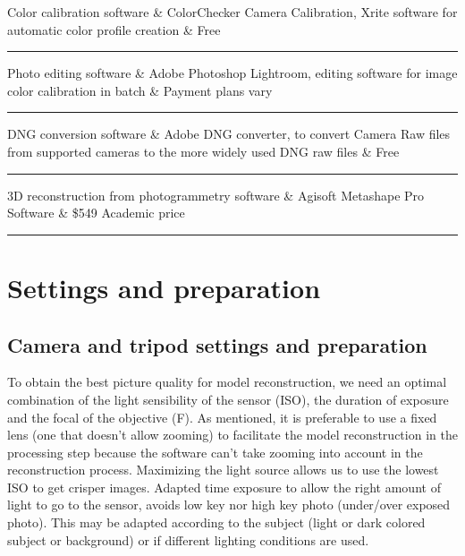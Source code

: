 \documentclass[
]{book}
\theoremstyle{definition}
\theoremstyle{definition}
\theoremstyle{definition}
\theoremstyle{definition}
\theoremstyle{remark}
\begin{document}
Color calibration software \& ColorChecker Camera Calibration, Xrite
software for automatic color profile creation \& Free\\

\begin{center}\rule{0.5\linewidth}{0.5pt}\end{center}

Photo editing software \& Adobe Photoshop Lightroom, editing software for
image color calibration in batch \& Payment plans vary\\

\begin{center}\rule{0.5\linewidth}{0.5pt}\end{center}

DNG conversion software \& Adobe DNG converter, to convert Camera Raw
files from supported cameras to the more widely used DNG raw files \&
Free\\

\begin{center}\rule{0.5\linewidth}{0.5pt}\end{center}

\hfill\break
3D reconstruction from photogrammetry software \& Agisoft Metashape Pro
Software \& \$549 Academic price\\

\begin{center}\rule{0.5\linewidth}{0.5pt}\end{center}

\hypertarget{settings-and-preparation}{%
\chapter{Settings and preparation}\label{settings-and-preparation}}

\hypertarget{camera-and-tripod-settings-and-preparation}{%
\section{Camera and tripod settings and preparation}\label{camera-and-tripod-settings-and-preparation}}

To obtain the best picture quality for model reconstruction, we need an
optimal combination of the light sensibility of the sensor (ISO), the
duration of exposure and the focal of the objective (F). As mentioned,
it is preferable to use a fixed lens (one that doesn't allow zooming) to
facilitate the model reconstruction in the processing step because the
software can't take zooming into account in the reconstruction process.
Maximizing the light source allows us to use the lowest ISO to get
crisper images. Adapted time exposure to allow the right amount of light
to go to the sensor, avoids low key nor high key photo (under/over
exposed photo). This may be adapted according to the subject (light or
dark colored subject or background) or if different lighting conditions
are used.
\end{document}
